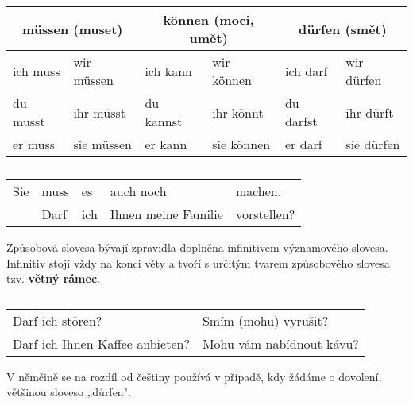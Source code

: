       \begin{table}[ht!]   %
        \hspace*{1em}
        \begin{tabular}{llllll}
          \hline
          \multicolumn{2}{c}{müssen (muset)}  & \multicolumn{2}{c}{können (moci, umět)}
                                              & \multicolumn{2}{c}{dürfen (smět)}       \\ 
          \hline
          ich muss  & wir müssen & ich kann   & wir können  & ich darf   & wir dürfen   \\
          du  musst & ihr müsst  & du  kannst & ihr könnt   & du  darfst & ihr dürft    \\
          er  muss  & sie müssen & er  kann   & sie können  & er  darf   & sie dürfen   \\
          \hline
        \end{tabular}
        \caption*{ }
      \end{table}
      \begin{table}[ht!]   %
        \hspace*{1em}
        \begin{tabular}{lllll}
          \hline
             Sie   &  muss & es  & auch noch           & machen.          \\
                   & Darf  & ich & Ihnen meine Familie & vorstellen?      \\
          \hline
        \end{tabular}
        \caption*{ }
      \end{table}
      Způsobová slovesa bývají zpravidla doplněna infinitivem významového slovesa. Infinitiv stojí 
      vždy na konci věty a tvoří s určitým tvarem způsobového slovesa tzv. \textbf{větný rámec}.
      \begin{table}[ht!]   %
        \hspace*{1em}
        \begin{tabular}{ll}
          \hline
          Darf ich stören?                &  Smím (mohu) vyrušit?           \\
          Darf ich Ihnen Kaffee anbieten? &  Mohu vám nabídnout kávu?       \\
          \hline
        \end{tabular}
        \caption*{ }
      \end{table}
      
      V němčině se na rozdíl od češtiny používá v případě, kdy žádáme o dovolení, většinou sloveso 
      „důrfen".
